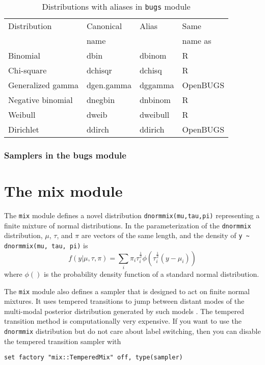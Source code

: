\documentclass[11pt, a4paper, titlepage]{report}
\begin{document}
\begin{table}
\begin{center}
\begin{tabular}{llll}
\hline
Distribution & Canonical & Alias & Same \\
             & name      &       & name as \\
\hline
Binomial           & dbin       & dbinom   & R   \\
Chi-square         & dchisqr    & dchisq   & R   \\ 
Generalized gamma  & dgen.gamma & dggamma  & OpenBUGS \\
Negative binomial  & dnegbin    & dnbinom  & R   \\
Weibull            & dweib      & dweibull & R   \\ 
Dirichlet          & ddirch     & ddirich  & OpenBUGS \\
\hline
\end{tabular}
\caption{Distributions with aliases in \texttt{bugs} module
  \label{table:bugs:distributions:alias}}
\end{center}
\end{table}

\subsection{Samplers in the bugs module}


\chapter{The mix module}

The \verb+mix+ module defines a novel distribution
\verb+dnormmix(mu,tau,pi)+ representing a finite mixture of normal
distributions. In the parameterization of the \verb+dnormmix+
distribution, $\mu$, $\tau$, and $\pi$ are vectors of the same length,
and the density of \verb+y ~ dnormmix(mu, tau, pi)+ is
\[
f(y | \mu, \tau, \pi) = \sum_i \pi_i \tau_i^{\frac{1}{2}} \phi( \tau^{\frac{1}{2}}_i (y - \mu_i))
\]
where $\phi()$ is the probability density function of a standard
normal distribution.

The \verb+mix+ module also defines a sampler that is designed to act
on finite normal mixtures. It uses tempered transitions to jump
between distant modes of the multi-modal posterior distribution
generated by such models \cite{Neal94,Celeux99}. The tempered
transition method is computationally very expensive. If you want to
use the \verb+dnormmix+ distribution but do not care about label
switching, then you can disable the tempered transition sampler with
\begin{verbatim}
set factory "mix::TemperedMix" off, type(sampler)
\end{verbatim}
\end{document}
